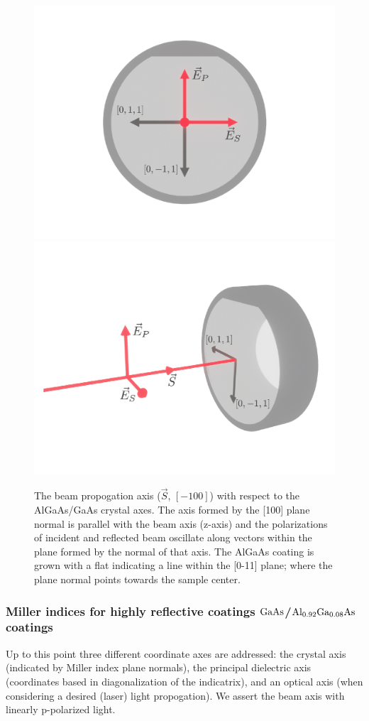 \begin{figure}[!h]
    \begin{subcaptiongroup}
	    \includegraphics[width=.5\textwidth]{figs/ALGAAS/coating_orientation_normal.pdf}
	    \label{co_normal}
	    \includegraphics[width=.5\textwidth]{figs/ALGAAS/coating_orientation_isometric.pdf}
	    \label{co_iso}
    \end{subcaptiongroup}
\caption{The beam propogation axis ($\vec{S}$, $[-100]$) with respect to the AlGaAs/GaAs crystal axes. The axis formed by the [100] plane normal is parallel with the beam axis (z-axis) and the polarizations of incident and reflected beam oscillate along vectors within the plane formed by the normal of that axis. The AlGaAs coating is grown with a flat indicating a line within the [0-11] plane; where the plane normal points towards the sample center.}
\label{fig:algaas_coords}
\end{figure}

\subsubsection{Miller indices for highly reflective coatings $\mathrm{GaAs}$/$\mathrm{Al_{0.92}Ga_{0.08}As}$ coatings}
Up to this point three different coordinate axes are addressed: the crystal axis (indicated by Miller index plane normals), the principal dielectric axis (coordinates based in diagonalization of the indicatrix), and an optical axis (when considering a desired (laser) light propogation). We assert the beam axis \cite{fig:algaas_coords} with linearly p-polarized light.


